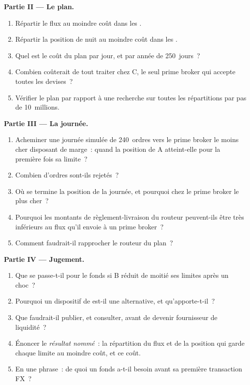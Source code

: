 \begin{problem}
\medskip\noindent\textbf{Partie II --- Le plan.}
\begin{enumerate}[resume]
\item Répartir le flux au moindre coût dans les .
\item Répartir la position de nuit au moindre coût dans les .
\item Quel est le coût du plan par jour, et par année de 250~jours~?
\item Combien coûterait de tout traiter chez C, le seul prime broker qui accepte toutes les
devises~?
\item Vérifier le plan par rapport à une recherche sur toutes les répartitions par pas de 10~millions.
\end{enumerate}

\medskip\noindent\textbf{Partie III --- La journée.}
\begin{enumerate}[resume]
\item Acheminer une journée simulée de 240~ordres vers le prime broker le moins cher disposant de marge~: quand la
position de A atteint-elle pour la première fois sa limite~?
\item Combien d'ordres sont-ils rejetés~?
\item Où se termine la position de la journée, et pourquoi chez le prime broker le plus cher~?
\item Pourquoi les montants de règlement-livraison du routeur peuvent-ils être très inférieurs au flux qu'il envoie à un prime broker~?
\item Comment faudrait-il rapprocher le routeur du plan~?
\end{enumerate}

\medskip\noindent\textbf{Partie IV --- Jugement.}
\begin{enumerate}[resume]
\item Que se passe-t-il pour le fonds si B réduit de moitié ses limites après un choc~?
\item Pourquoi un dispositif de  est-il une alternative, et qu'apporte-t-il~?
\item Que faudrait-il publier, et consulter, avant de devenir fournisseur de liquidité~?
\item Énoncer le \emph{résultat nommé}~: la répartition du flux et de la position qui garde chaque
limite au moindre coût, et ce coût.
\item En une phrase~: de quoi un fonds a-t-il besoin avant sa première transaction FX~?
\end{enumerate}
\end{problem}

